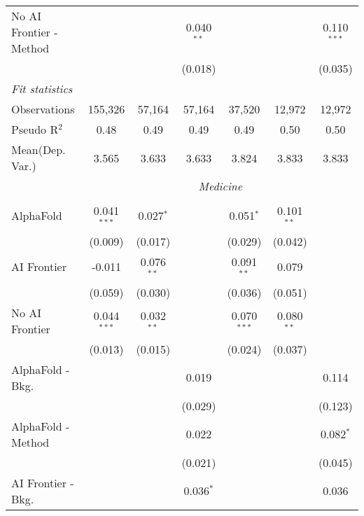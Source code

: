 \begin{tabular}{lcccccc}
   No AI Frontier - Method &               &              & 0.040$^{**}$ &               &               & 0.110$^{***}$\\   
                           &               &              & (0.018)      &               &               & (0.035)\\   
   \midrule
   \emph{Fit statistics}\\
   Observations            & 155,326       & 57,164       & 57,164       & 37,520        & 12,972        & 12,972\\  
   Pseudo R$^2$            & 0.48          & 0.49         & 0.49         & 0.49          & 0.50          & 0.50\\  
   
Mean(Dep. Var.) & 3.565 & 3.633 & 3.633 & 3.824 & 3.833 & 3.833 \\
 & \multicolumn{6}{c}{\textit{Medicine}} \\ \\
   AlphaFold               & 0.041$^{***}$ & 0.027$^{*}$  &               & 0.051$^{*}$   & 0.101$^{**}$ &   \\   
                           & (0.009)       & (0.017)      &               & (0.029)       & (0.042)      &   \\   
   AI Frontier             & -0.011        & 0.076$^{**}$ &               & 0.091$^{**}$  & 0.079        &   \\   
                           & (0.059)       & (0.030)      &               & (0.036)       & (0.051)      &   \\   
   No AI Frontier          & 0.044$^{***}$ & 0.032$^{**}$ &               & 0.070$^{***}$ & 0.080$^{**}$ &   \\   
                           & (0.013)       & (0.015)      &               & (0.024)       & (0.037)      &   \\   
   AlphaFold - Bkg.        &               &              & 0.019         &               &              & 0.114\\   
                           &               &              & (0.029)       &               &              & (0.123)\\   
   AlphaFold - Method      &               &              & 0.022         &               &              & 0.082$^{*}$\\   
                           &               &              & (0.021)       &               &              & (0.045)\\   
   AI Frontier - Bkg.      &               &              & 0.036$^{*}$   &               &              & 0.036\\   

\end{tabular}
